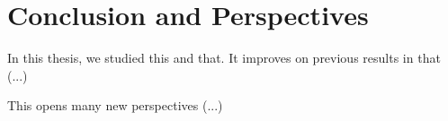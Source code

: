
\chapter{Conclusion and Perspectives}
\label{cha:conclusion}


In this thesis, we studied this and that.
It improves on previous results in that (...)


\tinyskip 


This opens many new perspectives (...)
